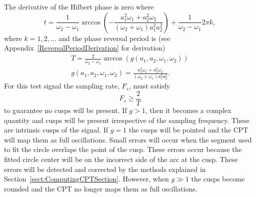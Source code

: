 \documentclass[journal,11pt,a4paper,onecolumn,draftcls]{IEEEtran}
\begin{document}
The derivative of the Hilbert phase is zero where
\begin{equation}\label{StationaryPhaseTimes}
    t=\frac{1}{\omega_2-\omega_1}\arccos\left(-\frac{a_1^2\omega_1 + a_2^2\omega_2}{(\omega_2 +
    \omega_1)a_1^2a_2^2}\right)+\frac{1}{\omega_2-\omega_1}2\pi k,
\end{equation}
where $k=1,2,...$ and the phase reversal period is (see Appendix~\ref{ReversalPeriodDerivation} for derivation) 
\begin{eqnarray}\label{PhaseReversalPeriod}
    T=\frac{2}{\omega_2-\omega_1}\arccos\left(g\left(a_1,a_2,\omega_1,\omega_2\right)\right) \\ 
g\left(a_1,a_2,\omega_1,\omega_2\right) = \frac{a_1^2\omega_1 + a_2^2\omega_2}{(\omega_2 +
    \omega_1)a_1^2a_2^2}.
\end{eqnarray}
For this test signal the sampling rate, $F_s$, must satisfy
\begin{equation}
    F_s \ge \frac{2}{T}
\end{equation}
to guarantee no cusps will be present. If $g>1$, then it becomes a complex quantity and cusps will be present irrespective of the sampling frequency. These are intrinsic cusps of the signal. If $g=1$ the cusps will be pointed and the CPT will map them as full oscillations. Small errors will occur when the segment used to fit the circle overlaps the point of the cusp. These errors occur because the fitted circle center will be on the incorrect side of the arc at the cusp. These errors will be detected and corrected by the methods explained in Section~\ref{sect:ComputingCPTSection}. However, when $g \gg 1$ the cusps become rounded and the CPT no longer maps them as full oscillations. 
% 
% 
\end{document}
